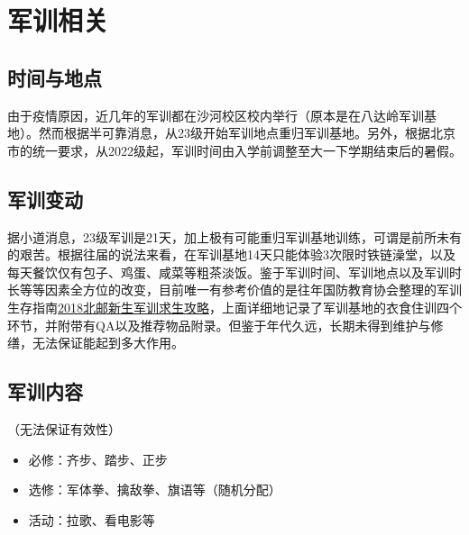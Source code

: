 \section{军训相关}

\subsection{时间与地点}

由于疫情原因，近几年的军训都在沙河校区校内举行（原本是在八达岭军训基地）。然而根据半可靠消息，从23级开始军训地点重归军训基地。另外，根据北京市的统一要求，从2022级起，军训时间由入学前调整至大一下学期结束后的暑假。

\subsection{军训变动}

据小道消息，23级军训是21天，加上极有可能重归军训基地训练，可谓是前所未有的艰苦。根据往届的说法来看，在军训基地14天只能体验3次限时铁链澡堂，以及每天餐饮仅有包子、鸡蛋、咸菜等粗茶淡饭。鉴于军训时间、军训地点以及军训时长等等因素全方位的改变，目前唯一有参考价值的是往年国防教育协会整理的军训生存指南\href{https://shimo.im/docs/473QMD0rGVc6MV3w/}{2018北邮新生军训求生攻略}，上面详细地记录了军训基地的衣食住训四个环节，并附带有QA以及推荐物品附录。但鉴于年代久远，长期未得到维护与修缮，无法保证能起到多大作用。

\subsection{军训内容}
（无法保证有效性）
\begin{itemize}
    \item 必修：齐步、踏步、正步
    \item 选修：军体拳、擒敌拳、旗语等（随机分配）
    \item 活动：拉歌、看电影等
\end{itemize}
